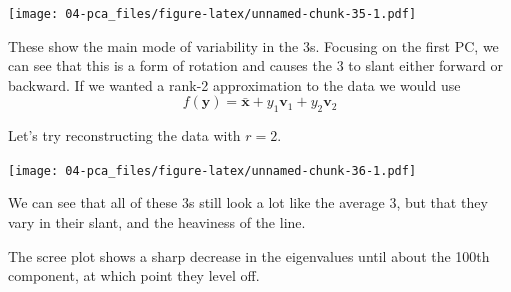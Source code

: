 \documentclass[]{book}
\newenvironment{Shaded}{\begin{snugshade}}{\end{snugshade}}
\newcommand{\CommentTok}[1]{\textcolor[rgb]{0.56,0.35,0.01}{\textit{#1}}}
\newcommand{\DataTypeTok}[1]{\textcolor[rgb]{0.13,0.29,0.53}{#1}}
\newcommand{\DecValTok}[1]{\textcolor[rgb]{0.00,0.00,0.81}{#1}}
\newcommand{\KeywordTok}[1]{\textcolor[rgb]{0.13,0.29,0.53}{\textbf{#1}}}
\newcommand{\NormalTok}[1]{#1}
\newcommand{\OperatorTok}[1]{\textcolor[rgb]{0.81,0.36,0.00}{\textbf{#1}}}
\newcommand{\StringTok}[1]{\textcolor[rgb]{0.31,0.60,0.02}{#1}}
\theoremstyle{definition}
\theoremstyle{definition}
\theoremstyle{definition}
\theoremstyle{remark}
\begin{document}
\begin{Shaded}
\end{Shaded}

\texttt{[image: 04-pca\_files/figure-latex/unnamed-chunk-35-1.pdf]}

These show the main mode of variability in the 3s. Focusing on the first PC, we can see that this is a form of rotation and causes the 3 to slant either forward or backward. If we wanted a rank-2 approximation to the data we would use
\[f(\boldsymbol y) = \bar{\boldsymbol x} + y_1 \boldsymbol v_1 + y_2 \boldsymbol v_2\]

Let's try reconstructing the data with \(r=2\).

\begin{Shaded}
\end{Shaded}

\texttt{[image: 04-pca\_files/figure-latex/unnamed-chunk-36-1.pdf]}

We can see that all of these 3s still look a lot like the average 3, but that they vary in their slant, and the heaviness of the line.

The scree plot shows a sharp decrease in the eigenvalues until about the 100th component, at which point they level off.

\begin{Shaded}
\end{Shaded}
\end{document}
